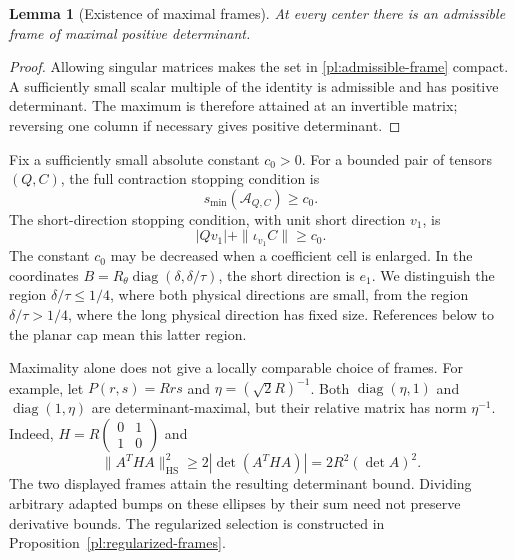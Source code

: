 \documentclass[11pt]{amsart}
\newtheorem{lemma}[theorem]{Lemma}
\theoremstyle{definition}
\theoremstyle{remark}
\numberwithin{equation}{section}
\begin{document}
\begin{lemma}[Existence of maximal frames]\label{pl:maximal-existence}\label{pl:maximal-stopping}
At every center there is an admissible frame of maximal positive determinant.
\end{lemma}

\begin{proof}
Allowing singular matrices makes the set in \eqref{pl:admissible-frame} compact. A sufficiently small scalar multiple of the identity is admissible and has positive determinant. The maximum is therefore attained at an invertible matrix; reversing one column if necessary gives positive determinant.

\end{proof}

Fix a sufficiently small absolute constant $c_0>0$. For a bounded pair of tensors $(Q,C)$, the full contraction stopping condition is
\begin{equation}\label{pl:full-rank-stop}
s_{\min}(\mathcal A_{Q,C})\ge c_0.
\end{equation}
The short-direction stopping condition, with unit short direction $v_1$, is
\begin{equation}\label{pl:short-stop}
|Qv_1|+\|\iota_{v_1}C\|\ge c_0.
\end{equation}
The constant $c_0$ may be decreased when a coefficient cell is enlarged. In the coordinates $B=R_\theta\operatorname{diag}(\delta,\delta/\tau)$, the short direction is $e_1$. We distinguish the region $\delta/\tau\le1/4$, where both physical directions are small, from the region $\delta/\tau>1/4$, where the long physical direction has fixed size. References below to the planar cap mean this latter region.

Maximality alone does not give a locally comparable choice of frames. For example, let $P(r,s)=Rrs$ and $\eta=(\sqrt2R)^{-1}$. Both $\operatorname{diag}(\eta,1)$ and $\operatorname{diag}(1,\eta)$ are determinant-maximal, but their relative matrix has norm $\eta^{-1}$. Indeed, $H=R\left(\begin{smallmatrix}0&1\\1&0\end{smallmatrix}\right)$ and
\[
\|A^THA\|_{\mathrm{HS}}^2\ge2|\det(A^THA)|=2R^2(\det A)^2.
\]
The two displayed frames attain the resulting determinant bound. Dividing arbitrary adapted bumps on these ellipses by their sum need not preserve derivative bounds. The regularized selection is constructed in Proposition~\ref{pl:regularized-frames}.
\end{document}
